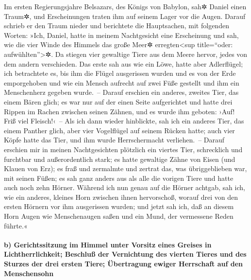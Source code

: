 Im ersten Regierungsjahre Belsazars, des Königs von
Babylon, sah✲ Daniel einen Traum✲, und Erscheinungen traten ihm auf
seinem Lager vor die Augen. Darauf schrieb er den Traum nieder und
berichtete die Hauptsachen, mit folgenden Worten: »Ich,
Daniel, hatte in meinem Nachtgesicht eine Erscheinung und sah, wie die
vier Winde des Himmels das große Meer✲ erregten\textless sup
title=``oder: aufwühlten''\textgreater✲. Da stiegen vier
gewaltige Tiere aus dem Meere hervor, jedes von dem andern verschieden.
Das erste sah aus wie ein Löwe, hatte aber Adlerflügel;
ich betrachtete es, bis ihm die Flügel ausgerissen wurden und es von der
Erde emporgehoben und wie ein Mensch aufrecht auf zwei Füße gestellt und
ihm ein Menschenherz gegeben wurde.~-- Darauf erschien ein
anderes, zweites Tier, das einem Bären glich; es war nur auf der einen
Seite aufgerichtet und hatte drei Rippen im Rachen zwischen seinen
Zähnen, und es wurde ihm geboten: ›Auf! Friß viel Fleisch!‹~--
Als ich dann wieder hinblickte, sah ich ein anderes Tier,
das einem Panther glich, aber vier Vogelflügel auf seinem Rücken hatte;
auch vier Köpfe hatte das Tier, und ihm wurde Herrschermacht
verliehen.~-- Darauf erschien mir in meinen Nachtgesichten
plötzlich ein viertes Tier, schrecklich und furchtbar und
außerordentlich stark; es hatte gewaltige Zähne von Eisen (und Klauen
von Erz); es fraß und zermalmte und zertrat das, was übriggeblieben war,
mit seinen Füßen; es sah ganz anders aus als alle die vorigen Tiere und
hatte auch noch zehn Hörner. Während ich nun genau auf die
Hörner achtgab, sah ich, wie ein anderes, kleines Horn zwischen ihnen
hervorschoß, worauf drei von den ersten Hörnern vor ihm ausgerissen
wurden; und jetzt sah ich, daß an diesem Horn Augen wie Menschenaugen
saßen und ein Mund, der vermessene Reden führte.«

\hypertarget{b-gerichtssitzung-im-himmel-unter-vorsitz-eines-greises-in-lichtherrlichkeit-beschluuxdf-der-vernichtung-des-vierten-tieres-und-des-sturzes-der-drei-ersten-tiere-uxfcbertragung-ewiger-herrschaft-auf-den-menschensohn}{%
\paragraph{b) Gerichtssitzung im Himmel unter Vorsitz eines Greises in
Lichtherrlichkeit; Beschluß der Vernichtung des vierten Tieres und des
Sturzes der drei ersten Tiere; Übertragung ewiger Herrschaft auf den
Menschensohn}\label{b-gerichtssitzung-im-himmel-unter-vorsitz-eines-greises-in-lichtherrlichkeit-beschluuxdf-der-vernichtung-des-vierten-tieres-und-des-sturzes-der-drei-ersten-tiere-uxfcbertragung-ewiger-herrschaft-auf-den-menschensohn}}

